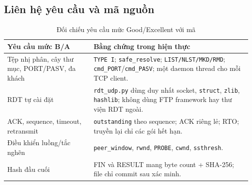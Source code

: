 \subsection{Liên hệ yêu cầu và mã nguồn}
\begin{table}[H]\centering\small
\begin{tabular}{|p{4.2cm}|p{7.7cm}|}\hline
\textbf{Yêu cầu mức B/A}&\textbf{Bằng chứng trong hiện thực}\\\hline
Tệp nhị phân, cây thư mục, PORT/PASV, đa khách&\texttt{TYPE I}; \texttt{safe\_resolve}; \texttt{LIST/NLST/MKD/RMD}; \texttt{cmd\_PORT}/\texttt{cmd\_PASV}; một daemon thread cho mỗi TCP client.\\\hline
RDT tự cài đặt&\texttt{rdt\_udp.py} dùng duy nhất socket, \texttt{struct}, \texttt{zlib}, \texttt{hashlib}; không dùng FTP framework hay thư viện RDT ngoài.\\\hline
ACK, sequence, timeout, retransmit&\texttt{outstanding} theo sequence; ACK riêng lẻ; RTO; truyền lại chỉ các gói hết hạn.\\\hline
Điều khiển luồng/tắc nghẽn&\texttt{peer\_window}, \texttt{rwnd}, \texttt{PROBE}, \texttt{cwnd}, \texttt{ssthresh}.\\\hline
Hash đầu cuối&FIN và RESULT mang byte count + SHA-256; file chỉ commit sau xác minh.\\\hline
\end{tabular}\caption{Đối chiếu yêu cầu mức Good/Excellent với mã}\end{table}
